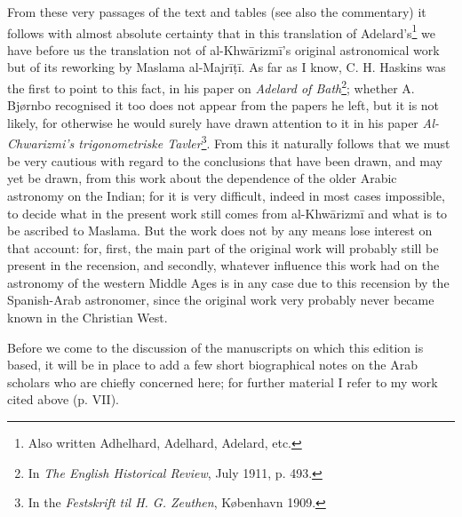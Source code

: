\documentclass[11pt]{article}
\newcommand{\Pg}[1]{\marginpar{\footnotesize\color{gray}#1}}
\begin{document}
\par \Pg{VIII}From these very passages of the text and tables (see also the commentary) it follows with almost absolute certainty that in this translation of Adelard's\footnote{Also written Adhelhard, Adelhard, Adelard, etc.} we have before us the translation not of al-Khwārizmī's original astronomical work but of its reworking by Maslama al-Majrīṭī. As far as I know, C. H. Haskins was the first to point to this fact, in his paper on \emph{Adelard of Bath}\footnote{In \emph{The English Historical Review}, July 1911, p. 493.}; whether A. Bjørnbo recognised it too does not appear from the papers he left, but it is not likely, for otherwise he would surely have drawn attention to it in his paper \emph{Al-Chwarizmi’s trigonometriske Tavler}\footnote{In the \emph{Festskrift til H. G. Zeuthen}, København 1909.}. From this it naturally follows that we must be very cautious with regard to the conclusions that have been drawn, and may yet be drawn, from this work about the dependence of the older Arabic astronomy on the Indian; for it is very difficult, indeed in most cases impossible, to decide what in the present work still comes from al-Khwārizmī and what is to be ascribed to Maslama. But the work does not by any means lose interest on that account: for, first, the main part of the original work will probably still be present in the recension, and secondly, whatever influence this work had on the astronomy of the western Middle Ages is in any case due to this recension by the Spanish-Arab astronomer, since the original work very probably never became known in the Christian West.\par
\par Before we come to the discussion of the manuscripts on which this edition is based, it will be in place to add a few short biographical notes on the Arab scholars who are chiefly concerned here; for further material I refer to my work cited above (p. VII).\par
\end{document}
